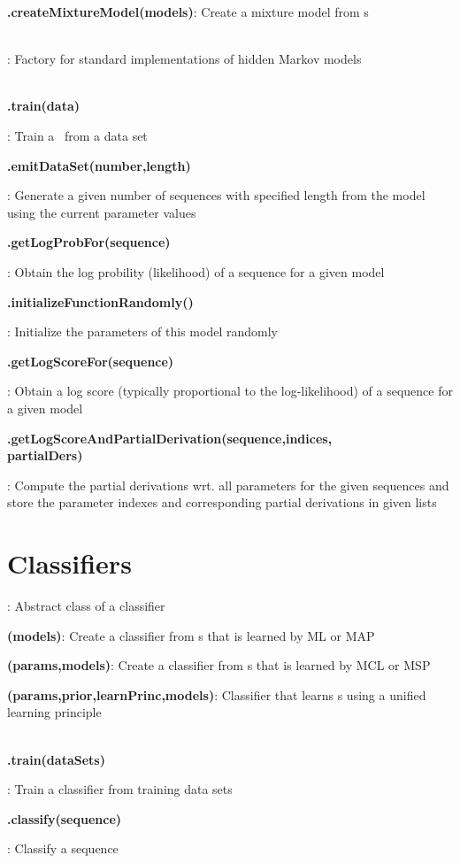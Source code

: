\documentclass[10pt]{scrartcl}
\newcommand{\entry}[3]{{\item[]\bfseries #1#2}: #3}
\newcommand{\entrys}[3]{\item[\emph{static}] {\bfseries {#1#2}}: #3}
\newcommand{\entryn}[3]{\item[new] {\bfseries {#1#2}}: #3}
\newcommand{\sep}{\\~\vspace{-0.1cm}}
\begin{document}
\begin{flushleft}
\begin{itemize*}
\entrys{\DiffSMFactory}{.createMixtureModel(models)}{Create a mixture model from \DiffSM s}\sep

\entry{\HMMFactory}{}{Factory for standard implementations of hidden Markov models}\sep

\entry{\TrainSM}{.train(data)}{Train a \TrainSM~from a data set}

\entry{\StatMod}{.emitDataSet(number,length)}{Generate a given number of sequences with specified length from the model using the current parameter values}

\entry{\StatMod}{.getLogProbFor(sequence)}{Obtain the log probility (likelihood) of a sequence for a given model}

\entry{\DiffSS}{.initializeFunctionRandomly()}{Initialize the parameters of this model randomly}

\entry{\DiffSS}{.getLogScoreFor(sequence)}{Obtain a log score (typically proportional to the log-likelihood) of a sequence for a given model}

\entry{\DiffSS}{.getLogScoreAndPartialDerivation(sequence,indices,\\partialDers)}{Compute the partial derivations wrt. all parameters for the given sequences and store the parameter indexes and corresponding partial derivations in given lists}

\end{itemize*}

\section{Classifiers}

\begin{itemize*}

\entry{\AbstractClassifier}{}{Abstract class of a classifier}

\entryn{\TrainSMBasedClassifier}{(models)}{Create a classifier from \TrainSM s that is learned by ML or MAP}

\entryn{\MSPClassifier}{(params,models)}{Create a classifier from \DiffSM s that is learned by MCL or MSP}

\entryn{\GenDisMixClassifier}{(params,prior,learnPrinc,models)}{Classifier that learns \DiffSM s using a unified learning principle}\sep

\entry{\AbstractClassifier}{.train(dataSets)}{Train a classifier from training data sets}

\entry{\AbstractClassifier}{.classify(sequence)}{Classify a sequence}


\end{itemize*}
\end{flushleft}
\end{document}
